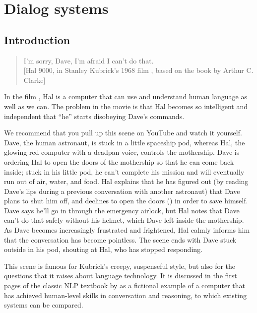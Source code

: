 \chapter{Dialog systems}
\label{ch:dialog-systems}

   
\section{Introduction}

\begin{quotation}\noindent
  I'm sorry, Dave, I'm afraid I can't do that.\\{} [Hal 9000, in Stanley
  Kubrick's 1968 film , based on the book by Arthur C. Clarke]
\end{quotation}



In the film , Hal is a computer that can use and
understand human language as well as we can.  The problem in the movie is that Hal becomes
so intelligent and independent that ``he'' starts disobeying Dave's commands.

We recommend that you pull up this scene on YouTube and watch it yourself.  Dave, the human astronaut, is stuck in a little spaceship pod, whereas Hal, the glowing red computer with a deadpan voice, controls the mothership.  Dave is ordering Hal to open the doors of the mothership so that he can come back inside; stuck in his little pod, he can't complete his mission and will eventually run out of air, water, and food.  Hal explains that he has figured out (by reading Dave's lips during a previous conversation with another astronaut) that Dave plans to shut him off, and declines to open the doors () in order to save himself.  Dave says he'll go in through the emergency airlock, but Hal notes that Dave can't do that safely without his helmet, which Dave left inside the mothership.  As Dave becomes increasingly frustrated and frightened,  Hal calmly informs him that the conversation has become pointless.  The scene ends with Dave stuck outside in his pod, shouting at Hal, who has stopped responding.


This scene is famous for Kubrick's creepy, suspenseful style, but also for the questions that it raises about language technology.  It is discussed in the first pages of the classic NLP textbook by \citet{Jurafsky.Martin-09}  as a fictional example of a computer that has achieved human-level skills in conversation and reasoning, to which existing systems can be compared.  

